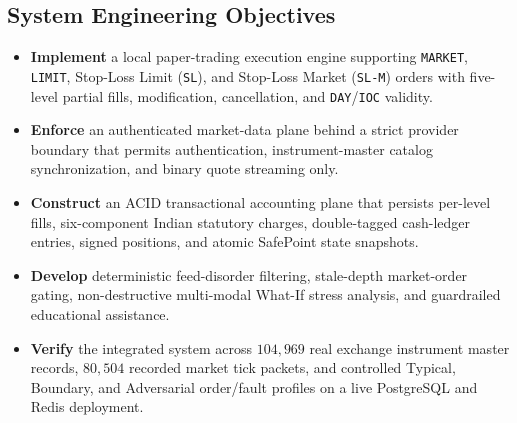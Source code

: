 \documentclass[12pt]{article}
\begin{document}
\subsection{System Engineering Objectives}
\begin{itemize}
  \item \textbf{Implement} a local paper-trading execution engine supporting \texttt{MARKET}, \texttt{LIMIT}, Stop-Loss Limit (\texttt{SL}), and Stop-Loss Market (\texttt{SL-M}) orders with five-level partial fills, modification, cancellation, and \texttt{DAY}/\texttt{IOC} validity.
  \item \textbf{Enforce} an authenticated market-data plane behind a strict provider boundary that permits authentication, instrument-master catalog synchronization, and binary quote streaming only.
  \item \textbf{Construct} an ACID transactional accounting plane that persists per-level fills, six-component Indian statutory charges, double-tagged cash-ledger entries, signed positions, and atomic SafePoint state snapshots.
  \item \textbf{Develop} deterministic feed-disorder filtering, stale-depth market-order gating, non-destructive multi-modal What-If stress analysis, and guardrailed educational assistance.
  \item \textbf{Verify} the integrated system across $104{,}969$ real exchange instrument master records, $80{,}504$ recorded market tick packets, and controlled Typical, Boundary, and Adversarial order/fault profiles on a live PostgreSQL and Redis deployment.
\end{itemize}
\end{document}
